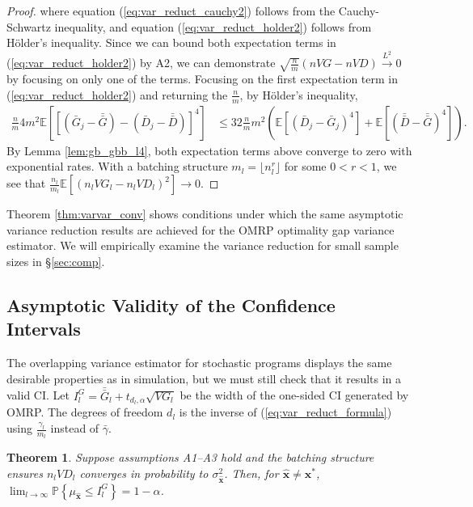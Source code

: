 \documentclass[12pt]{article}
\newtheorem{theorem}{Theorem}
\newcommand{\p}[1]{\mathbb{P} \left\{ #1 \right\}}
\newcommand{\e}[1]{\mathbb{E} \left[ #1 \right]
}
\newcommand{\x}{\mathbf{x}}
\newcommand{\xh}{{\hat{\x}}}
\newcommand{\xs}{\x^*}
\newcommand{\gammab}{\bar{\gamma}}
\newcommand{\gb}{\bar{G}}
\newcommand{\gbb}{\bar{\gb}}
\newcommand{\db}{\bar{D}}
\newcommand{\dbb}{\bar{\db}}
\begin{document}
\begin{proof}
	where equation (\ref{eq:var_reduct_cauchy2}) follows from the Cauchy-Schwartz inequality, and equation (\ref{eq:var_reduct_holder2}) follows from H\"{o}lder's inequality.  
        Since we can bound both expectation terms in (\ref{eq:var_reduct_holder2}) by A2, we can demonstrate $\sqrt{\frac{n}{m}}(nVG - nVD) \xrightarrow{L^2} 0$ by focusing on only one of the terms.  
        Focusing on the first expectation term in (\ref{eq:var_reduct_holder2}) and returning the $\tfrac{n}{m}$, by H\"{o}lder's inequality,
	\begin{align*}
		\frac{n}{m} 4m^2 \e{\left[(\gb_j - \gbb) - (\db_j - \dbb)\right]^4}	& \leq 32 \frac{n}{m} m^2\left( \e{(\db_j - \gb_j)^4} + \e{(\dbb - \gbb)^4} \right).
	\end{align*}	
	By Lemma \ref{lem:gb_gbb_l4}, both expectation terms above converge to zero with exponential rates.  
        With a batching structure $m_l = \lfloor n_l^r \rfloor$ for some $0<r<1$, we see that $\frac{n_l}{m_l} \e{(n_l VG_l - n_l VD_l)^2} \rightarrow 0$.
\end{proof} 


Theorem \ref{thm:varvar_conv} shows conditions under which the same asymptotic variance reduction results are achieved for the OMRP optimality gap variance estimator. 
We will empirically examine the variance reduction for small sample sizes in \S \ref{sec:comp}. 

\subsection{Asymptotic Validity of the Confidence Intervals}

The overlapping variance estimator for stochastic programs displays the same desirable properties as in simulation, but we must still check that it results in a valid CI.  
Let $I^G_l = \gbb_l + t_{d_l,\alpha} \sqrt{VG_l}$ be the width of the one-sided CI generated by OMRP. 
The degrees of freedom $d_l$ is the inverse of (\ref{eq:var_reduct_formula}) using $\frac{\gamma_l}{m_l}$ instead of $\gammab$.

\begin{theorem} \label{thm:conf_int}
	Suppose assumptions A1--A3 hold and the batching structure ensures $n_l VD_l$ converges in probability to $\sigma^2_\xh$.  
        Then, for $\xh \neq \xs$, $\lim_{l\rightarrow\infty} \p{\mu_\xh \leq I^G_l} = 1 - \alpha$.
\end{theorem}
\end{document}

